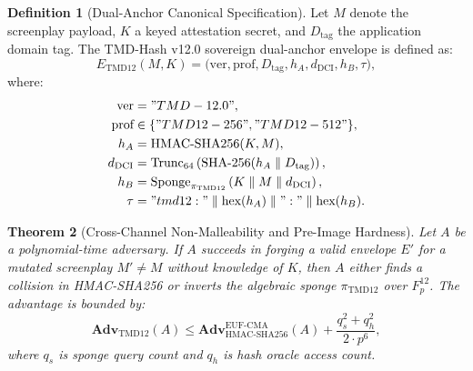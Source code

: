 \documentclass[11pt,a4paper,reqno]{article}
\def\texttt#1{#1}%
\def\mathcal#1{#1}%
\def\mathbb#1{#1}%
\theoremstyle{plain}
\newtheorem{theorem}{Theorem}[section]
\theoremstyle{definition}
\newtheorem{definition}[theorem]{Definition}
\theoremstyle{remark}
\numberwithin{equation}{section}
\begin{document}
\begin{definition}[{Dual-Anchor Canonical Specification}]
Let $\mathcal{M}$ denote the screenplay payload, $\mathcal{K}$ a keyed attestation secret, and $\mathcal{D}_{\text{tag}}$ the application domain tag. The TMD-Hash v12.0 sovereign dual-anchor envelope is defined as:
\begin{equation}
\label{eq:tmd12_envelope_def}
\mathcal{E}_{\text{TMD12}}(\mathcal{M}, \mathcal{K}) = \big( \text{ver}, \text{prof}, \mathcal{D}_{\text{tag}}, h_A, d_{\text{DCI}}, h_B, \tau \big),
\end{equation}
where:
\begin{align}
\text{ver} &= \texttt{"TMD-12.0"}, \\
\text{prof} &\in \{\texttt{"TMD12-256"}, \texttt{"TMD12-512"}\}, \\
h_A &= \text{HMAC-SHA256}(\mathcal{K}, \mathcal{M}), \label{eq:channel_a_hmac} \\
d_{\text{DCI}} &= \text{Trunc}_{64}\left(\text{SHA-256}(h_A \parallel \mathcal{D}_{\text{tag}})\right), \label{eq:dci_inject} \\
h_B &= \text{Sponge}_{\pi_{\text{TMD12}}}\left(\mathcal{K} \parallel \mathcal{M} \parallel d_{\text{DCI}}\right), \label{eq:channel_b_sponge} \\
\tau &= \texttt{"tmd12:"} \parallel \text{hex}(h_A) \parallel \texttt{":"} \parallel \text{hex}(h_B). \label{eq:canonical_ledger}
\end{align}
\end{definition}

\begin{theorem}[{Cross-Channel Non-Malleability and Pre-Image Hardness}]
Let $\mathcal{A}$ be a polynomial-time adversary. If $\mathcal{A}$ succeeds in forging a valid envelope $\mathcal{E}'$ for a mutated screenplay $\mathcal{M}' \ne \mathcal{M}$ without knowledge of $\mathcal{K}$, then $\mathcal{A}$ either finds a collision in HMAC-SHA256 or inverts the algebraic sponge $\pi_{\text{TMD12}}$ over $\mathbb{F}_p^{12}$. The advantage is bounded by:
\begin{equation}
\label{eq:security_bound}
\mathbf{Adv}_{\text{TMD12}}(\mathcal{A}) \le \mathbf{Adv}_{\text{HMAC-SHA256}}^{\text{EUF-CMA}}(\mathcal{A}) + \frac{q_s^2 + q_h^2}{2 \cdot p^6},
\end{equation}
where $q_s$ is sponge query count and $q_h$ is hash oracle access count.
\end{theorem}

\end{document}
